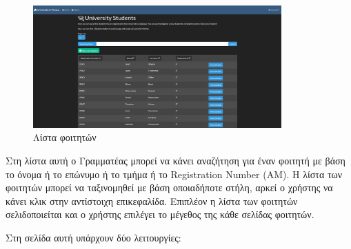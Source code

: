 \documentclass[12pt]{article}
\begin{document}
	\begin{figure}[H]
		\centering
		\includegraphics[width=0.85\textwidth]{lists.png}
		\caption{Λίστα φοιτητών}
		\label{fig:emptyView}
	\end{figure}

	Στη λίστα αυτή ο Γραμματέας μπορεί να κάνει αναζήτηση για έναν φοιτητή με βάση το όνομα ή το επώνυμο ή το τμήμα ή το Registration Number (ΑΜ). Η λίστα των φοιτητών μπορεί να ταξινομηθεί με βάση οποιαδήποτε στήλη, αρκεί ο χρήστης να κάνει κλικ στην αντίστοιχη επικεφαλίδα. Επιπλέον η λίστα των φοιτητών σελιδοποιείται και ο χρήστης επιλέγει το μέγεθος της κάθε σελίδας φοιτητών.
	
	Στη σελίδα αυτή υπάρχουν δύο λειτουργίες:
	
\end{document}
